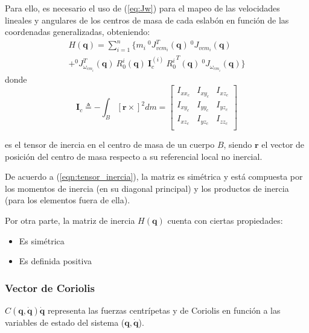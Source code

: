     Para ello, es necesario el uso de (\ref{eq:Jw}) para el mapeo de las velocidades lineales y angulares de los centros de masa
    de cada eslabón en función de las coordenadas generalizadas, obteniendo: 
    \begin{multline}
        \label{eqn:inertia_matrix}
        H(\boldsymbol{q}) = \sum_{i=1}^n \{ m_i \: ^0J_{v{cm_i}}^T(\boldsymbol{q}) \: ^0J_{v{cm_i}}(\boldsymbol{q}) \\ 
        + ^0J_{\omega_{cm_i}}^T (\boldsymbol{q}) \: R_0^i(\boldsymbol{q}) \: \boldsymbol{I}_c^{(i)} \: {R_0^i}^T (\boldsymbol{q}) \: {^0J_{\omega_{cm_i}}}(\boldsymbol{q}) \}
    \end{multline}
    donde 
    \begin{equation}
        \label{eqn:tensor_inercia}
        \boldsymbol{I}_c \triangleq - \int_B [\boldsymbol{r} \times]^2 dm  = 
        \begin{bmatrix}
            I_{xx_c} & I_{xy_c} & I_{xz_c} \\
            I_{xy_c} & I_{yy_c} & I_{yz_c} \\
            I_{xz_c} & I_{yz_c} & I_{zz_c} \\
        \end{bmatrix}
    \end{equation}
    
    es el tensor de inercia en el centro de masa de un cuerpo $B$, siendo $\boldsymbol{r}$ el vector de posición del centro de masa respecto a su referencial local no inercial.
    
    De acuerdo a (\ref{eqn:tensor_inercia}), la matriz es simétrica y está compuesta por los momentos de inercia (en su diagonal principal) y los productos de inercia 
    (para los elementos fuera de ella). 

    Por otra parte, la matriz de inercia $H(\boldsymbol{q})$ cuenta con ciertas propiedades:
    \begin{itemize}
        \item Es simétrica
        \item Es definida positiva
    \end{itemize}

    \subsubsection{Vector de Coriolis}
    \noindent $C(\boldsymbol{q}, \boldsymbol{\dot{q}}) \boldsymbol{\dot{q}}$ representa las fuerzas centrípetas y de Coriolis 
    en función a las variables de estado del sistema ($\boldsymbol{q}, \boldsymbol{\dot{q}}$). 
    
